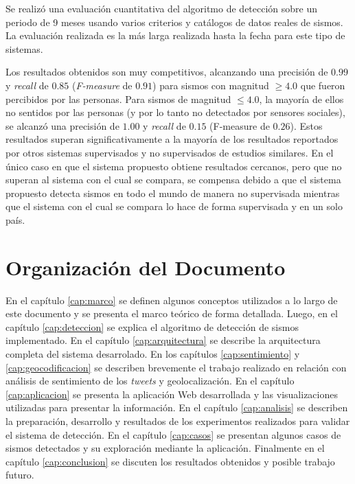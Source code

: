 Se realizó una evaluación cuantitativa del algoritmo de detección sobre un periodo de 9 meses usando varios criterios y catálogos de datos reales de sismos. 
%
La evaluación realizada es la más larga realizada hasta la fecha para este tipo de sistemas.


Los resultados obtenidos son muy competitivos, alcanzando una precisión de $0.99$ y \textit{recall} de $0.85$ (\textit{F-measure} de $0.91$) para sismos con magnitud $\geq 4.0$ que fueron percibidos por las personas. 
%
Para sismos de magnitud $\leq 4.0$, la mayoría de ellos no sentidos por las personas (y por lo tanto no detectados por sensores sociales), se alcanzó una precisión de $1.00$ y \textit{recall} de $0.15$ (F-measure de $0.26$).
%
Estos resultados superan significativamente a la mayoría de los resultados reportados por otros sistemas supervisados y no supervisados de estudios similares.
%
En el único caso en que el sistema propuesto obtiene resultados cercanos, pero que no superan al sistema con el cual se compara, se compensa debido a que el sistema propuesto detecta sismos en todo el mundo de manera no supervisada mientras que el sistema con el cual se compara lo hace de forma supervisada y en un solo país.


\section{Organización del Documento}

En el capítulo \ref{cap:marco} se definen algunos conceptos utilizados a lo largo de este documento y se presenta el marco teórico de forma detallada. 
%
Luego, en el capítulo \ref{cap:deteccion} se explica el algoritmo de detección de sismos implementado. 
%
En el capítulo \ref{cap:arquitectura} se describe la arquitectura completa del sistema desarrolado. 
%
En los capítulos \ref{cap:sentimiento} y \ref{cap:geocodificacion} se describen brevemente el trabajo realizado en relación con análisis de sentimiento de los \textit{tweets} y geolocalización. 
% 
En el capítulo \ref{cap:aplicacion} se presenta la aplicación Web desarrollada y las visualizaciones utilizadas para presentar la información. 
%
En el capítulo \ref{cap:analisis} se describen la preparación, desarrollo y resultados de los experimentos realizados para validar el sistema de detección. 
%
En el capítulo \ref{cap:casos} se presentan algunos casos de sismos detectados y su exploración mediante la aplicación.
%
Finalmente en el capítulo \ref{cap:conclusion} se discuten los resultados obtenidos y posible trabajo futuro.  
